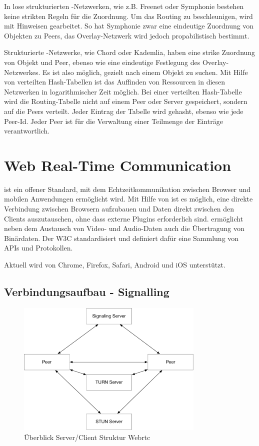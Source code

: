 In lose strukturierten \pTp-Netzwerken, wie z.B. Freenet\cite{freenet} oder Symphonie\cite{symphonie} bestehen keine strikten Regeln für die Zuordnung. Um das Routing zu beschleunigen, wird mit Hinweisen gearbeitet. So hat Symphonie zwar eine eindeutige Zuordnung von Objekten zu Peers, das Overlay-Netzwerk wird jedoch propabilistisch bestimmt. 

Strukturierte \pTp-Netzwerke, wie Chord\cite{chord} oder Kademlia\cite{kademlia}, haben eine strike Zuordnung von Objekt und Peer, ebenso wie eine eindeutige Festlegung des Overlay-Netzwerkes. Es ist also möglich, gezielt nach einem Objekt zu suchen. Mit Hilfe von verteilten Hash-Tabellen ist das Auffinden von Ressourcen in diesen Netzwerken in logarithmischer Zeit möglich. Bei einer verteilten Hash-Tabelle wird die Routing-Tabelle nicht auf einem Peer oder Server gespeichert, sondern auf die Peers verteilt. Jeder Eintrag der Tabelle wird gehasht, ebenso wie jede Peer-Id. Jeder Peer ist für die Verwaltung einer Teilmenge der Einträge verantwortlich. 

\section{\webrtc Web Real-Time Communication}

\webrtc ist ein offener Standard, mit dem Echtzeitkommunikation zwischen Browser und mobilen Anwendungen ermöglicht wird. Mit Hilfe von \webrtc ist es möglich, eine direkte Verbindung zwischen Browsern aufzubauen und Daten direkt zwischen den Clients auszutauschen, ohne dass externe Plugins erforderlich sind. \webrtc ermöglicht neben dem Austausch von Video- und Audio-Daten auch die Übertragung von Binärdaten.\cite{webrtc-book} Der W3C\cite{w3Webrtc} standardisiert \webrtc und definiert dafür eine Sammlung von APIs und Protokollen.

Aktuell wird \webrtc von Chrome, Firefox, Safari, Android und iOS unterstützt.\cite{caniuse-webrtc}

\subsection{Verbindungsaufbau - Signalling}

\begin{figure}[!h]
	\centering
	\includegraphics[width=0.8\textwidth]{figures/Webrtc_overview}
	\caption[Überblick Server/Client Struktur Webrtc]{Überblick Server/Client Struktur Webrtc}
	\label{fig:webrtc_overview}
\end{figure}

